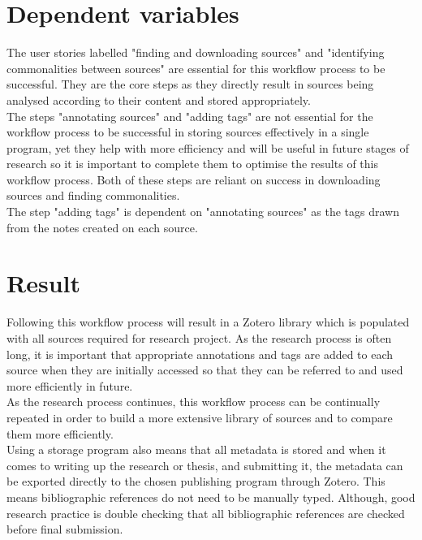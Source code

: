 \documentclass{article}
\begin{document}
\section{Dependent variables}
The user stories labelled "finding and downloading sources" and "identifying commonalities between sources" are essential for this workflow process to be successful. They are the core steps as they directly result in sources being analysed according to their content and stored appropriately.\\
The steps "annotating sources" and "adding tags" are not essential for the workflow process to be successful in storing sources effectively in a single program, yet they help with more efficiency and will be useful in future stages of research so it is important to complete them to optimise the results of this workflow process. Both of these steps are reliant on success in downloading sources and finding commonalities.\\
The step "adding tags" is dependent on "annotating sources" as the tags drawn from the notes created on each source.  

\section{Result}
Following this workflow process will result in a Zotero library which is populated with all sources required for research project. As the research process is often long, it is important that appropriate annotations and tags are added to each source when they are initially accessed so that they can be referred to and used more efficiently in future.\\
As the research process continues, this workflow process can be continually repeated in order to build a more extensive library of sources and to compare them more efficiently.\\
Using a storage program also means that all metadata is stored and when it comes to writing up the research or thesis, and submitting it, the metadata can be exported directly to the chosen publishing program through Zotero. This means bibliographic references do not need to be manually typed. Although, good research practice is double checking that all bibliographic references are checked before final submission.
\end{document}
